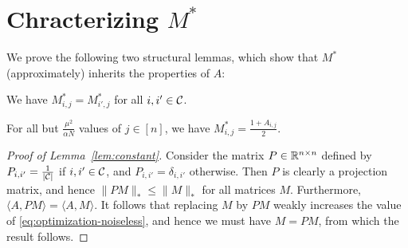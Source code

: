\documentclass[11pt]{article}
\newcommand{\M}{\tilde{M}}
\begin{document}
\section{Chracterizing $M^*$}
We prove the following two structural lemmas, which show that 
$M^*$ (approximately) inherits the properties of $A$:
\begin{lemma}
\label{lem:constant}
We have $M^*_{i,j} = M^*_{i',j}$ for all $i,i' \in \mathcal{C}$.
\end{lemma}

\begin{lemma}
\label{lem:ones}
For all but $\frac{\mu^2}{\alpha N}$ values of $j \in [n]$, we have
$M^*_{i,j} = \frac{1 + A_{i,j}}{2}$.
\end{lemma}

%

%
\begin{proof}[Proof of Lemma~\ref{lem:constant}]
Consider the matrix $P \in \mathbb{R}^{n \times n}$ defined by 
$P_{i,i'} = \frac{1}{|\mathcal{C}|}$ if $i,i' \in \mathcal{C}$, and 
$P_{i,i'} = \delta_{i,i'}$ otherwise. Then $P$ is clearly a 
projection matrix, and hence $\|PM\|_* \leq \|M\|_*$ for all 
matrices $M$. Furthermore, $\langle A, PM \rangle = \langle A, M \rangle$. 
It follows that replacing $M$ by $PM$ weakly increases the value of 
\eqref{eq:optimization-noiseless}, and hence we must have $M = PM$, from which 
the result follows.
\end{proof}
\end{document}
